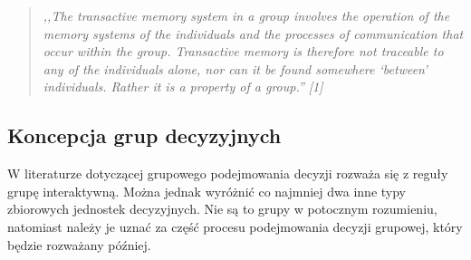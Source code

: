 \begin{quote}\em
,,The transactive memory system in a group involves the operation of the 
memory systems of the individuals and the processes of communication that occur 
within the group. Transactive memory is therefore not traceable to any of the 
individuals alone, nor can it be found somewhere `between' individuals. Rather 
it is a property of a group.'' [1]
\end{quote}

\subsection{Koncepcja grup decyzyjnych}
W literaturze dotyczącej grupowego podejmowania decyzji rozważa się z reguły grupę 
interaktywną. Można jednak wyróżnić co najmniej dwa inne typy zbiorowych jednostek decyzyjnych. 
Nie są to grupy w potocznym rozumieniu, natomiast należy je uznać za część procesu podejmowania 
decyzji grupowej, który będzie rozważany później.
